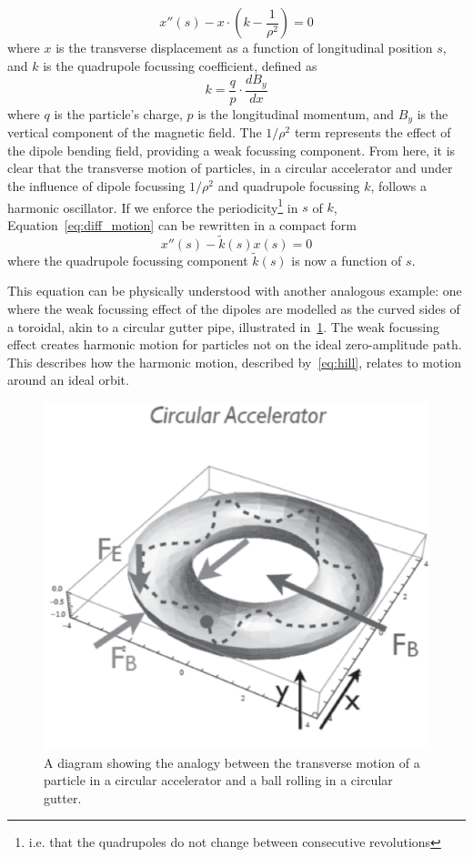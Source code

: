\documentclass[11pt]{report}
\begin{document}
\begin{equation}
  x''(s)-x\cdot\left(k-\frac{1}{\rho^2}\right)=0
  \label{eq:diff_motion}
\end{equation} 
where $x$ is the transverse displacement as a function of longitudinal position $s$, and $k$ is the quadrupole focussing coefficient, defined as
\begin{equation}
  k=\frac{q}{p}\cdot\frac{dB_y}{dx}
  \label{eq:quadrupole}
\end{equation} where $q$ is the particle's charge, $p$ is the longitudinal momentum, and $B_y$ is the vertical component of the magnetic field. The $1/\rho^2$ term represents the effect of the dipole bending field, providing a weak focussing component.
From here, it is clear that the transverse motion of particles, in a circular accelerator and under the influence of dipole focussing $1/\rho^2$ and quadrupole focussing $k$, follows a harmonic oscillator. If we enforce the periodicity\footnote{i.e. that the quadrupoles do not change between consecutive revolutions} in $s$ of $k$, Equation~\ref{eq:diff_motion} can be rewritten in a compact form
\begin{equation}
  x''(s)-\tilde{k}(s)x(s)=0
  \label{eq:hill}
\end{equation} where the quadrupole focussing component $\tilde{k}(s)$ is now a function of $s$. 

This equation can be physically understood with another analogous example: one where the weak focussing effect of the dipoles are modelled as the curved sides of a toroidal, akin to a circular gutter pipe, illustrated in~\ref{fig:guttering}. The weak focussing effect creates harmonic motion for particles not on the ideal zero-amplitude path. This describes how the harmonic motion, described by~\autoref{eq:hill}, relates to motion around an ideal orbit.

\begin{figure}[h]
  \centering
  \includegraphics*[width=0.6\linewidth]{guttering}
  \caption{A diagram showing the analogy between the transverse motion of a particle in a circular accelerator and a ball rolling in a circular gutter.}\label{fig:guttering}
\end{figure}
\end{document}
